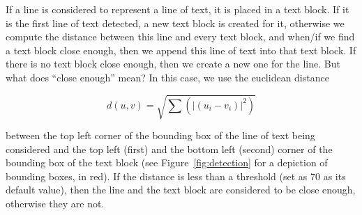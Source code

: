 \documentclass[]{IEEEtran}
\begin{document}
  If a line is considered to represent a line of text, it is placed in a text block. If it is the first line of text detected, a new text block is created for it, otherwise we compute the distance between this line and every text block, and when/if we find a text block close enough, then we append this line of text into that text block. If there is no text block close enough, then we create a new one for the line. But what does ``close enough'' mean? In this case, we use the euclidean distance
  
  \[d(u, v) = \sqrt{\sum ({\lvert (u_i - v_i) \rvert}^2)}\]
  
  between the top left corner of the bounding box of the line of text being considered and the top left (first) and the bottom left (second) corner of the bounding box of the text block (see Figure~\ref{fig:detection} for a depiction of bounding boxes, in red). If the distance is less than a threshold (set as 70 as its default value), then the line and the text block are considered to be close enough, otherwise they are not.
\end{document}
